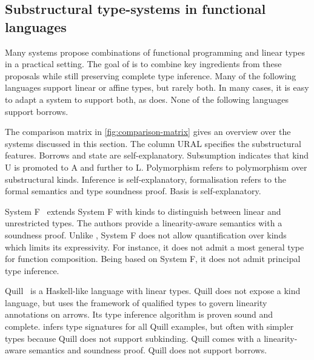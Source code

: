 \subsection{Substructural type-systems in functional languages}

Many systems propose combinations of
functional programming and linear types in a practical setting.
The goal of \lang is to combine key ingredients
from these proposals while still preserving
complete type inference.
Many of the following languages support linear or affine types, but rarely
both. In many cases, it is easy to adapt a system to support both, as
\lang does.
None of the following languages support borrows.

The comparison matrix in \cref{fig:comparison-matrix} gives an
overview over the systems discussed in this section. The column URAL
specifies the substructural features. Borrows and state are
self-explanatory. Subsumption indicates that kind U is promoted
to A and further to L. Polymorphism refers to polymorphism over
substructural kinds. Inference is self-explanatory, formalisation
refers to the formal semantics and type soundness proof. Basis is self-explanatory.

System F\degree~\citep{DBLP:conf/tldi/MazurakZZ10}
extends System F with kinds to distinguish
between linear and unrestricted types.
The authors provide
a linearity-aware semantics with a soundness proof.
Unlike \lang, System F\degree{} does not allow
quantification over kinds which limits its expressivity. For instance, it
does not admit a most general type for function composition.
Being based on System F, it does not admit
principal type inference.

Quill~\citep{DBLP:conf/icfp/Morris16} is a Haskell-like language with linear
types.
Quill does not expose a kind language, but
uses the framework of qualified types to govern linearity annotations on arrows.
Its type inference algorithm is proven sound and complete.
\lang infers type signatures for all Quill examples, but often with
simpler types because Quill does not support subkinding.
Quill comes with a linearity-aware semantics and soundness proof.
Quill does not support borrows.


